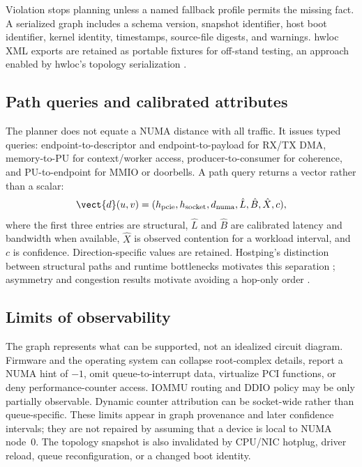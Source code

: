 Violation stops planning unless a named fallback profile permits the missing fact. A serialized graph includes a schema version, snapshot identifier, host boot identifier, kernel identity, timestamps, source-file digests, and warnings. hwloc XML exports are retained as portable fixtures for off-stand testing, an approach enabled by hwloc's topology serialization \cite{goglin2014hwloc}.

\subsection{Path queries and calibrated attributes}

The planner does not equate a NUMA distance with all traffic. It issues typed queries: endpoint-to-descriptor and endpoint-to-payload for RX/TX DMA, memory-to-PU for context/worker access, producer-to-consumer for coherence, and PU-to-endpoint for MMIO or doorbells. A path query returns a vector rather than a scalar:
\begin{equation}
  \vect{d}(u,v)=(h_{\mathrm{pcie}},h_{\mathrm{socket}},d_{\mathrm{numa}},
  \hat{L},\hat{B},\hat{X},c),
  \label{eq:path-vector}
\end{equation}
where the first three entries are structural, $\hat{L}$ and $\hat{B}$ are calibrated latency and bandwidth when available, $\hat{X}$ is observed contention for a workload interval, and $c$ is confidence. Direction-specific values are retained. Hostping's distinction between structural paths and runtime bottlenecks motivates this separation \cite{liu2023hostping}; asymmetry and congestion results motivate avoiding a hop-only order \cite{lepers2015asymmetry,dashti2013carrefour}.

\subsection{Limits of observability}

The graph represents what can be supported, not an idealized circuit diagram. Firmware and the operating system can collapse root-complex details, report a NUMA hint of $-1$, omit queue-to-interrupt data, virtualize PCI functions, or deny performance-counter access. IOMMU routing and DDIO policy may be only partially observable. Dynamic counter attribution can be socket-wide rather than queue-specific. These limits appear in graph provenance and later confidence intervals; they are not repaired by assuming that a device is local to NUMA node~0. The topology snapshot is also invalidated by CPU/NIC hotplug, driver reload, queue reconfiguration, or a changed boot identity.
